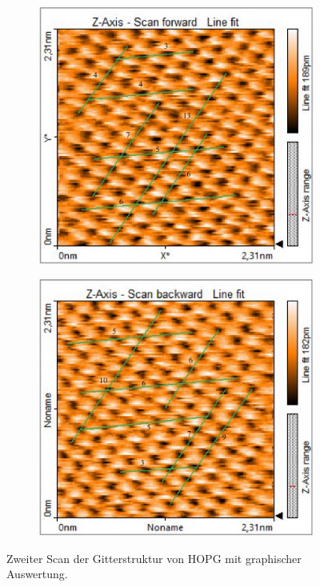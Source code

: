 \begin{figure}[h]
    \centering
    \begin{subfigure}{.475\linewidth}
      \includegraphics[width=\linewidth]{Messdaten/Gitter_Graphit/2_Bild_forwards.png}
    \end{subfigure}\hfill 
    \begin{subfigure}{.475\linewidth}
      \includegraphics[width=\linewidth]{Messdaten/Gitter_Graphit/2_Bild_backwards.png}
    \end{subfigure}
    \caption{Zweiter Scan der Gitterstruktur von HOPG mit graphischer Auswertung.}
    \label{fig:Gitter_Graphit_2}
\end{figure}


